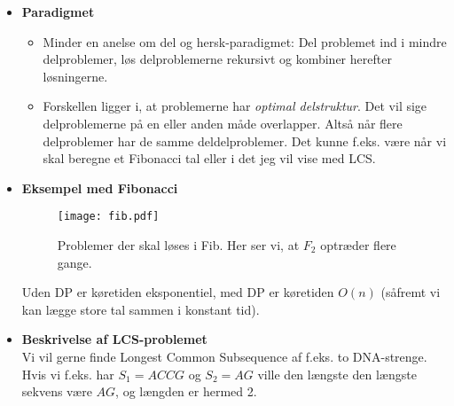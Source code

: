 \begin{itemize}
\item \textbf{Paradigmet}
\begin{itemize}
\item Minder en anelse om del og hersk-paradigmet: Del problemet ind i mindre delproblemer, løs delproblemerne rekursivt og kombiner herefter løsningerne.
\item Forskellen ligger i, at problemerne har \textit{optimal delstruktur}. Det vil sige delproblemerne på en eller anden måde overlapper. Altså når flere delproblemer har de samme deldelproblemer. Det kunne f.eks. være når vi skal beregne et Fibonacci tal eller i det jeg vil vise med LCS.
\end{itemize}


\item \textbf{Eksempel med Fibonacci}\\
\begin{figure}[H]
	\begin{center}
		\texttt{[image: fib.pdf]}
	\end{center}
	\caption{Problemer der skal løses i Fib. Her ser vi, at $F_2$ optræder flere gange.}
	\label{fig:fib}
\end{figure}

Uden DP er køretiden eksponentiel, med DP er køretiden $O(n)$ (såfremt vi kan lægge store tal sammen i konstant tid).


\item \textbf{Beskrivelse af LCS-problemet}\\
Vi vil gerne finde Longest Common Subsequence af f.eks. to DNA-strenge.\\
Hvis vi f.eks. har $S_1 = ACCG$ og $S_2 = AG$ ville den længste den længste sekvens være $AG$, og længden er hermed 2. 


\end{itemize}
